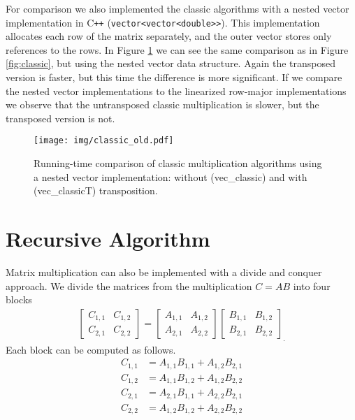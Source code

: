 \documentclass[a4paper,11pt]{article}
\newcommand{\cpp}{C\texttt{++} }
\begin{document}
For comparison we also implemented the classic algorithms with a nested vector implementation in \cpp (\verb$vector<vector<double>>$). This implementation allocates each row of the matrix separately, and the outer vector stores only references to the rows. In Figure \ref{fig:classic_old} we can see the same comparison as in Figure \ref{fig:classic}, but using the nested vector data structure. Again the transposed version is faster, but this time the difference is more significant. If we compare the nested vector implementations to the linearized row-major implementations we observe that the untransposed classic multiplication is slower, but the transposed version is not.
\begin{figure}[h]
\centering
\texttt{[image: img/classic\_old.pdf]}
\caption{Running-time comparison of classic multiplication algorithms using a nested vector implementation: without (\textsf{vec\_classic}) and with (\textsf{vec\_classicT}) transposition. }
\label{fig:classic_old}
\end{figure}



\section{Recursive Algorithm}
\label{section:recursive}

Matrix multiplication can also be implemented with a divide and conquer approach\cite{Cormen2009}. We divide the matrices from the multiplication $C=AB$ into four blocks
\begin{align*}
\begin{bmatrix}
C_{1,1} & C_{1,2} \\
C_{2,1} & C_{2,2}
\end{bmatrix}
=
\begin{bmatrix}
A_{1,1} & A_{1,2} \\
A_{2,1} & A_{2,2}
\end{bmatrix}
\begin{bmatrix}
B_{1,1} & B_{1,2} \\
B_{2,1} & B_{2,2}
\end{bmatrix}
_{\text{.}}
\end{align*}
%
Each block can be computed as follows.
\begin{align*}
C_{1,1} &= A_{1,1}B_{1,1} + A_{1,2}B_{2,1} \\
C_{1,2} &= A_{1,1}B_{1,2} + A_{1,2}B_{2,2} \\
C_{2,1} &= A_{2,1}B_{1,1} + A_{2,2}B_{2,1} \\
C_{2,2} &= A_{1,2}B_{1,2} + A_{2,2}B_{2,2}
\end{align*}
\end{document}
